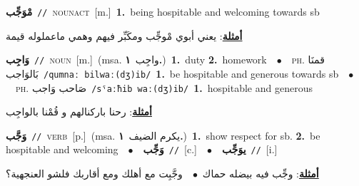 \documentclass[10pt,a4paper,twoside]{article} %
\begin{document}
\begin{multicols}{2}
{\setlength\topsep{0pt}\textbf{\foreignlanguage{arabic}{مْوَجِّب}}\ {\color{gray}\texttt{//}\color{black}}\ \textsc{noun\textunderscore act}\ [m.]\ \textbf{1.}~being  hospitable and welcoming towards sb\  \begin{flushright}\color{gray}\foreignlanguage{arabic}{\textbf{\underline{\foreignlanguage{arabic}{أمثلة}}}: يعني أبوي مْوجِّب ومكَبِّر فيهم وهمي ماعملوله قيمة}\end{flushright}\color{black}} \vspace{2mm}

{\setlength\topsep{0pt}\textbf{\foreignlanguage{arabic}{وَاجِب}}\ {\color{gray}\texttt{//}\color{black}}\ \textsc{noun}\ [m.]\ \color{gray}(msa. \foreignlanguage{arabic}{واجِب}~\foreignlanguage{arabic}{\textbf{١.}})\color{black}\ \textbf{1.}~duty  \textbf{2.}~homework\ \ $\bullet$\ \ \textsc{ph.} \color{gray} \foreignlanguage{arabic}{قمنَا بَالوَاجب}\color{black}\ {\color{gray}\texttt{/{\sffamily qumnaː bilwaː(dʒ)ib}/}\color{black}}\ \textbf{1.}~be hospitable and generous towards sb\ \ $\bullet$\ \ \textsc{ph.} \color{gray} \foreignlanguage{arabic}{صَاحب وَاجب}\color{black}\ {\color{gray}\texttt{/{\sffamily sˤaːħib waː(dʒ)ib}/}\color{black}}\ \textbf{1.}~hospitable and generous\  \begin{flushright}\color{gray}\foreignlanguage{arabic}{\textbf{\underline{\foreignlanguage{arabic}{أمثلة}}}: رحنا باركنالهم و قُمْنا بالواجِب}\end{flushright}\color{black}} \vspace{2mm}

{\setlength\topsep{0pt}\textbf{\foreignlanguage{arabic}{وَجَّب}}\ {\color{gray}\texttt{//}\color{black}}\ \textsc{verb}\ [p.]\ \color{gray}(msa. \foreignlanguage{arabic}{يكرم الضيف}~\foreignlanguage{arabic}{\textbf{١.}})\color{black}\ \textbf{1.}~show respect for sb.  \textbf{2.}~be hospitable and welcoming\ \ $\bullet$\ \ \setlength\topsep{0pt}\textbf{\foreignlanguage{arabic}{وَجِّب}}\ {\color{gray}\texttt{//}\color{black}}\ [c.]\ \ $\bullet$\ \ \setlength\topsep{0pt}\textbf{\foreignlanguage{arabic}{يوَجِّب}}\ {\color{gray}\texttt{//}\color{black}}\ [i.]\  \begin{flushright}\color{gray}\foreignlanguage{arabic}{\textbf{\underline{\foreignlanguage{arabic}{أمثلة}}}: وجِّب فيه بيضله حماك\ $\bullet$\ \  وجَّبِت مع أهلك ومع أقاربك فلشو العنجهية؟}\end{flushright}\color{black}} \vspace{2mm}


\end{multicols}
\end{document}
